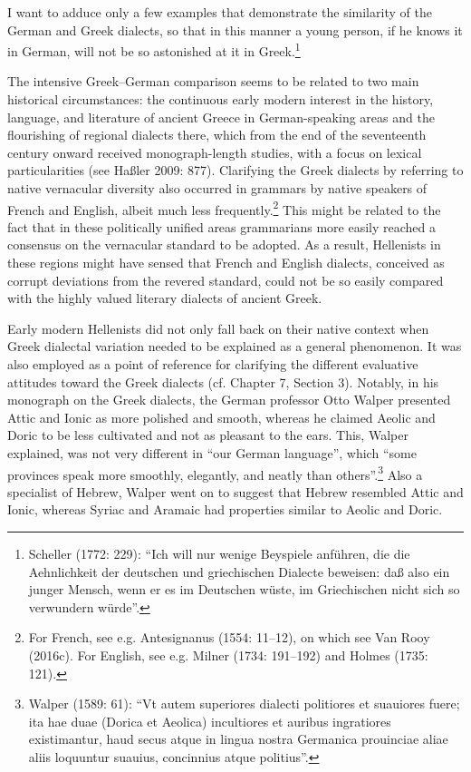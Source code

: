 \begin{styleQuote}
I want to adduce only a few examples that demonstrate the similarity of the German and Greek dialects, so that in this manner a young person, if he knows it in German, will not be so astonished at it in Greek.\footnote{ Scheller (1772: 229): “Ich will nur wenige Beyspiele anführen, die die Aehnlichkeit der deutschen und griechischen Dialecte beweisen: daß also ein junger Mensch, wenn er es im Deutschen wüste, im Griechischen nicht sich so verwundern würde”.}
\end{styleQuote}

\begin{styleStandard}
The intensive Greek–German comparison seems to be related to two main historical circumstances: the continuous early modern interest in the history, language, and literature of ancient Greece in German-speaking areas and the flourishing of regional dialects there, which from the end of the seventeenth century onward received monograph-length studies, with a focus on lexical particularities (see Haßler 2009: 877). Clarifying the Greek dialects by referring to native vernacular diversity also occurred in grammars by native speakers of French and English, albeit much less frequently.\footnote{ For French, see e.g. Antesignanus (1554: 11–12), on which see Van Rooy (2016c). For English, see e.g. Milner (1734: 191–192) and Holmes (1735: 121).} This might be related to the fact that in these politically unified areas grammarians more easily reached a consensus on the vernacular standard to be adopted. As a result, Hellenists in these regions might have sensed that French and English dialects, conceived as corrupt deviations from the revered standard, could not be so easily compared with the highly valued literary dialects of ancient Greek.
\end{styleStandard}

\begin{styleStandard}
Early modern Hellenists did not only fall back on their native context when Greek dialectal variation needed to be explained as a general phenomenon. It was also employed as a point of reference for clarifying the different evaluative attitudes toward the Greek dialects (cf. Chapter 7, Section 3). Notably, in his monograph on the Greek dialects, the German professor Otto Walper presented Attic and Ionic as more polished and smooth, whereas he claimed Aeolic and Doric to be less cultivated and not as pleasant to the ears. This, Walper explained, was not very different in “our German language”, which “some provinces speak more smoothly, elegantly, and neatly than others”.\footnote{ Walper (1589: 61): “Vt autem superiores dialecti politiores et suauiores fuere; ita hae duae (Dorica et Aeolica) incultiores et auribus ingratiores existimantur, haud secus atque in lingua nostra Germanica prouinciae aliae aliis loquuntur suauius, concinnius atque politius”.} Also a specialist of Hebrew, Walper went on to suggest that Hebrew resembled Attic and Ionic, whereas Syriac and Aramaic had properties similar to Aeolic and Doric.
\end{styleStandard}

